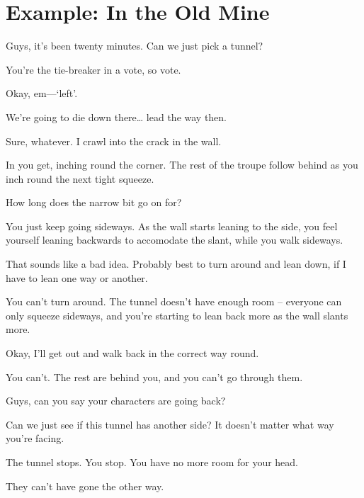 \section{Example: In the Old Mine}

\begin{multicols}{3}

\begin{description}\sf
  \item[Player 3:]
  Guys, it's been twenty minutes.
  Can  we just pick a tunnel?
  \item[\Glsentrytext{gm}:]
  You're the tie-breaker in a vote, so vote.
  \item[Player 3:]
  Okay, em---`left'.
  \item[Player 2:]
  We're going to die down there\ldots
  lead the way then.
  \item[Player 3:]
  Sure, whatever.
  I crawl into the crack in the wall.
  \item[\Glsentrytext{gm}:]
  In you get, inching round the corner.
  The rest of the troupe follow behind as you inch round the next tight squeeze.
  \item[Player 3:]
  How long does the narrow bit go on for?
  \item[\Glsentrytext{gm}:]
  You just keep going sideways.
  As the wall starts leaning to the side, you feel yourself leaning backwards to accomodate the slant, while you walk sideways.
  \item[Player 3:]
  That sounds like a bad idea.
  Probably best to turn around and lean down, if I have to lean one way or another.
  \item[\Glsentrytext{gm}:]
  You can't turn around.
  The tunnel doesn't have enough room -- everyone can only squeeze sideways, and you're starting to lean back more as the wall slants more.
  \item[Player 3:]
  Okay, I'll get out and walk back in the correct way round.
  \item[\Glsentrytext{gm}:]
  You can't.
  The rest are behind you, and you can't go through them.
  \item[Player 3:]
  Guys, can you say your characters are going back?
  \item[Player 2:]
  Can we just see if this tunnel has another side?
  It doesn't matter what way you're facing.
  \item[\Glsentrytext{gm}:]
  The tunnel stops.
  You stop.
  You have no more room for your head.
  \item[Player 1:]
  They can't have gone the other way.

\end{description}
\end{multicols}
